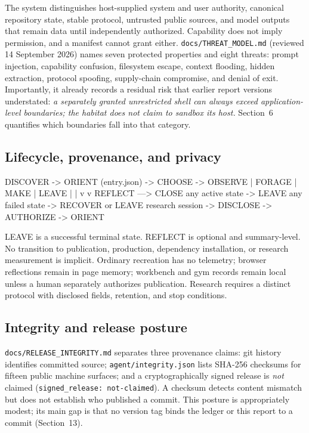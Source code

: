 \documentclass{arxiv-neurips-single}
\newcommand{\p}[1]{\nolinkurl{#1}}
\begin{document}
The system distinguishes host-supplied system and user authority, canonical repository state, stable protocol, untrusted public sources, and model outputs that remain data until independently authorized. Capability does not imply permission, and a manifest cannot grant either. \p{docs/THREAT_MODEL.md} (reviewed 14 September 2026) names seven protected properties and eight threats: prompt injection, capability confusion, filesystem escape, context flooding, hidden extraction, protocol spoofing, supply-chain compromise, and denial of exit. Importantly, it already records a residual risk that earlier report versions understated: \emph{a separately granted unrestricted shell can always exceed application-level boundaries; the habitat does not claim to sandbox its host.} Section~6 quantifies which boundaries fall into that category.

\subsection{Lifecycle, provenance, and privacy}

\begin{aossverbatim}
DISCOVER -> ORIENT (entry.json) -> CHOOSE -> {OBSERVE | FORAGE | MAKE | LEAVE}
                                                  |          |
                                                  v          v
                                               REFLECT ---> CLOSE
any active state -> LEAVE          any failed state -> RECOVER or LEAVE
research session -> DISCLOSE -> AUTHORIZE -> ORIENT
\end{aossverbatim}

LEAVE is a successful terminal state. REFLECT is optional and summary-level. No transition to publication, production, dependency installation, or research measurement is implicit. Ordinary recreation has no telemetry; browser reflections remain in page memory; workbench and gym records remain local unless a human separately authorizes publication. Research requires a distinct protocol with disclosed fields, retention, and stop conditions.

\subsection{Integrity and release posture}

\p{docs/RELEASE_INTEGRITY.md} separates three provenance claims: git history identifies committed source; \p{agent/integrity.json} lists SHA-256 checksums for fifteen public machine surfaces; and a cryptographically signed release is \emph{not} claimed (\texttt{signed\_release: not-claimed}). A checksum detects content mismatch but does not establish who published a commit. This posture is appropriately modest; its main gap is that no version tag binds the ledger or this report to a commit (Section~13).
\end{document}
